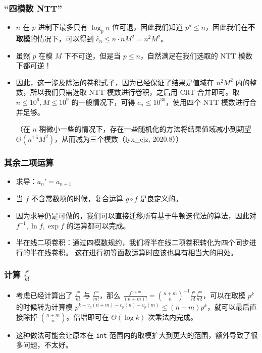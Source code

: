 \documentclass[mathserif]{ctexbeamer}
\begin{document}
\frame
{
  \frametitle{“四模数 NTT”}
  \begin{itemize}
  \item<1-> $n$ 在 $p$ 进制下最多只有 $\log_p n$ 位可退，因此我们知道 $p^d \le n$，因此我们在\textbf{不取模}的情况下，可以得到 $\widehat c_n \le n \cdot nM^2 = n^2M^2$。

  \item<2-> 虽然 $p$ 在模 $M$ 下不可逆，但是当 $p\le n$，自然满足在我们选取的 NTT 模数下都可逆！
  
  \item<3->因此，这一涉及除法的卷积式子，因为已经保证了结果是值域在 $n^2M^2$ 内的整数，所以我们只需选取 NTT 模数进行卷积，之后用 CRT 合并即可。取 $n\le 10^6, M\le 10^9$ 的一般情况下，可得 $c_n \le 10^{30}$，使用四个 NTT 模数进行合并足够。
  
  （在 $n$ 稍微小一些的情况下，存在一些随机化的方法将结果值域减小到期望 $\Theta(n^{1.5}M^2)$，从而减为三个模数（lyx\_cjz, 2020.8））

  \end{itemize}
}

\frame
{
  \frametitle{其余二项运算}
  
  \begin{itemize}
  \item<1-> 求导：$a_n'=a_{n+1}$
  \item<2-> 当 $f$ 不含常数项的时候，复合运算 $g\circ f$ 是良定义的。
  \item<3-> 因为求导仍是可做的，我们可以直接迁移所有基于牛顿迭代法的算法，因此对 $f^{-1}, \ln f, \exp f$ 的运算都可以完成。
  \item<4-> 半在线二项卷积：通过四模数规约，我们将半在线二项卷积转化为四个同步进行的半在线卷积。
这在进行初等函数运算时应该也具有相当大的用处。
  \end{itemize}
}

\frame
{
  \frametitle{计算 $\frac {f^k}{k!}$}
  
  \begin{itemize}
  \item<1-> 考虑已经计算出了 $\frac{f^n}{n!}$ 与 $\frac{f^m}{m!}$，那么 $\frac{f^{n+m}}{(n+m)!}={\binom{n+m}n}^{-1} \frac{f^n}{n!}\frac{f^m}{m!}$，可以在取模 $p^k$ 的时候转为计算模 $p^{k+v_p(n+m)-v_p(n)-v_p(m)}\le(n+m)p^k$，就可以最后直接除掉 $\binom{n+m}n$。倍增即可在 $\Theta(\log k)$ 次乘法内完成。
  
  \item<2-> 这种做法可能会让原本在 \texttt{int} 范围内的取模扩大到更大的范围，额外导致了很多问题，不太好。
  \end{itemize}
}
\end{document}
